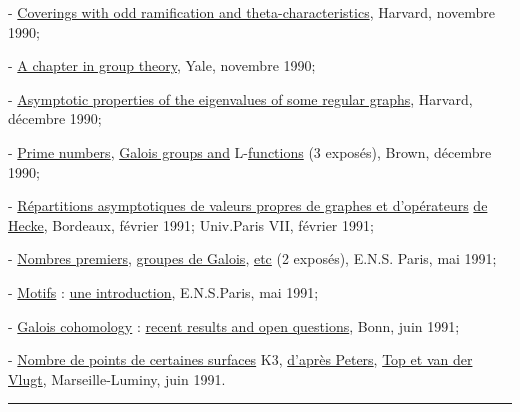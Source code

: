 
- \uline{Coverings with odd ramification and theta-characteristics}, Harvard,
novembre 1990;

- \uline{A chapter in group theory}, Yale, novembre 1990;

- \uline{Asymptotic properties of the eigenvalues of some regular graphs}, Harvard,
décembre 1990;

- \uline{Prime numbers}, \uline{Galois groups and} L-\uline{functions} (3 exposés), Brown, décembre
1990;

- \uline{Répartitions asymptotiques de valeurs propres de graphes et d'opérateurs}
\uline{de Hecke}, Bordeaux, février 1991; Univ.Paris VII, février 1991;

- \uline{Nombres premiers}, \uline{groupes de Galois}, \uline{etc} (2 exposés), E.N.S. Paris, mai
1991;

- \uline{Motifs} : \uline{une introduction}, E.N.S.Paris, mai 1991;

- \uline{Galois cohomology} : \uline{recent results and open questions}, Bonn, juin 1991;

- \uline{Nombre de points de certaines surfaces} K3, \uline{d'après Peters}, \uline{Top et van der}
\uline{Vlugt}, Marseille-Luminy, juin 1991.

\begin{center}\rule{4cm}{0.4pt}\end{center}

